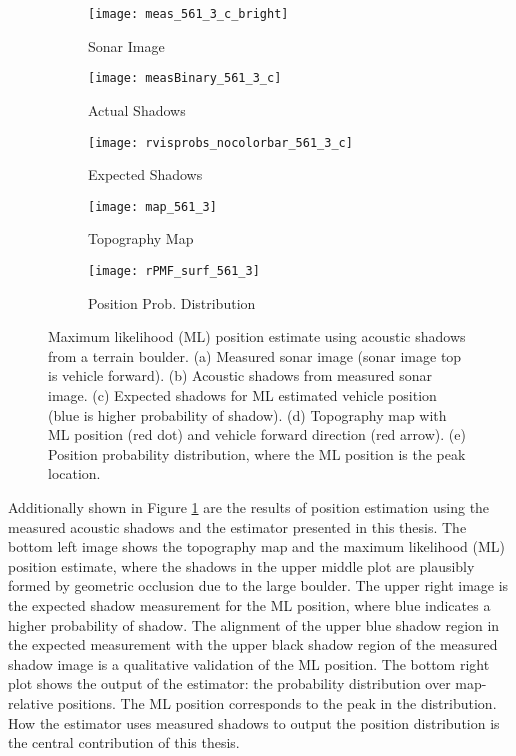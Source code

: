 \begin{figure}[!h]
  	\centering
	\begin{subfigure}[b]{0.3\textwidth}
                \texttt{[image: meas\_561\_3\_c\_bright]}
                \caption{Sonar Image}
  	\end{subfigure}
  	\centering
	\begin{subfigure}[b]{0.3\textwidth}
                \texttt{[image: measBinary\_561\_3\_c]}
                \caption{Actual Shadows}
  	\end{subfigure} 	
	\begin{subfigure}[b]{0.3\textwidth}
                \texttt{[image: rvisprobs\_nocolorbar\_561\_3\_c]}
                \caption{Expected Shadows}
  	\end{subfigure}
  	
  	\centering
	\begin{subfigure}[b]{0.45\textwidth}
                \texttt{[image: map\_561\_3]}
                \caption{Topography Map}
  	\end{subfigure}
  	\centering
	\begin{subfigure}[b]{0.5\textwidth}
                \texttt{[image: rPMF\_surf\_561\_3]}
                \caption{Position Prob. Distribution}
  	\end{subfigure}
  	
	\caption{Maximum likelihood (ML) position estimate using acoustic shadows from a terrain boulder. (a) Measured sonar image (sonar image top is vehicle forward). (b) Acoustic shadows from measured sonar image. (c) Expected shadows for ML estimated vehicle position (blue is higher probability of shadow). (d) Topography map with ML position (red dot) and vehicle forward direction (red arrow). (e) Position probability distribution, where the ML position is the peak location. }	
	\label{fig:shadows_561_3}
\end{figure}

Additionally shown in Figure \ref{fig:shadows_561_3} are the results of position estimation using the measured acoustic shadows and the estimator presented in this thesis.
The bottom left image shows the topography map and the maximum likelihood (ML) position estimate, where the shadows in the upper middle plot are plausibly formed by geometric occlusion due to the large boulder.
The upper right image is the expected shadow measurement for the ML position, where blue indicates a higher probability of shadow.
The alignment of the upper blue shadow region in the expected measurement with the upper black shadow region of the measured shadow image is a qualitative validation of the ML position.
The bottom right plot shows the output of the estimator: the probability distribution over map-relative positions.
The ML position corresponds to the peak in the distribution.
How the estimator uses measured shadows to output the position distribution is the central contribution of this thesis.

